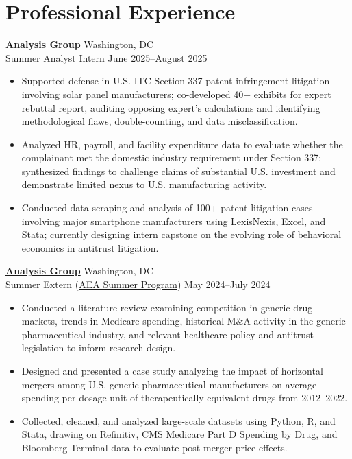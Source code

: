 \documentclass[10.5pt]{article} %
\begin{document}
\section*{Professional Experience}

\textbf{\href{https://www.analysisgroup.com/}{Analysis Group}} \hfill Washington, DC \\
Summer Analyst Intern \hfill June 2025--August 2025
\begin{itemize}
    \item Supported defense in U.S. ITC Section 337 patent infringement litigation involving solar panel manufacturers; co-developed 40+ exhibits for expert rebuttal report, auditing opposing expert’s calculations and identifying methodological flaws, double-counting, and data misclassification.
    \item Analyzed HR, payroll, and facility expenditure data to evaluate whether the complainant met the domestic industry requirement under Section 337; synthesized findings to challenge claims of substantial U.S. investment and demonstrate limited nexus to U.S. manufacturing activity.
    \item Conducted data scraping and analysis of 100+ patent litigation cases involving major smartphone manufacturers using LexisNexis, Excel, and Stata; currently designing intern capstone on the evolving role of behavioral economics in antitrust litigation.
\end{itemize}

\vspace{2pt} %
\noindent\textbf{\href{https://www.analysisgroup.com/}{Analysis Group}} \hfill Washington, DC \\
Summer Extern (\href{https://economics.howard.edu/articles/aeasp-2024-scholar-alejandro-de-la-torre}{AEA Summer Program}) \hfill May 2024--July 2024
\begin{itemize}
    \item Conducted a literature review examining competition in generic drug markets, trends in Medicare spending, historical M\&A activity in the generic pharmaceutical industry, and relevant healthcare policy and antitrust legislation to inform research design.
    \item Designed and presented a case study analyzing the impact of horizontal mergers among U.S. generic pharmaceutical manufacturers on average spending per dosage unit of therapeutically equivalent drugs from 2012--2022.
    \item Collected, cleaned, and analyzed large-scale datasets using Python, R, and Stata, drawing on Refinitiv, CMS Medicare Part D Spending by Drug, and Bloomberg Terminal data to evaluate post-merger price effects.
\end{itemize}
\end{document}
